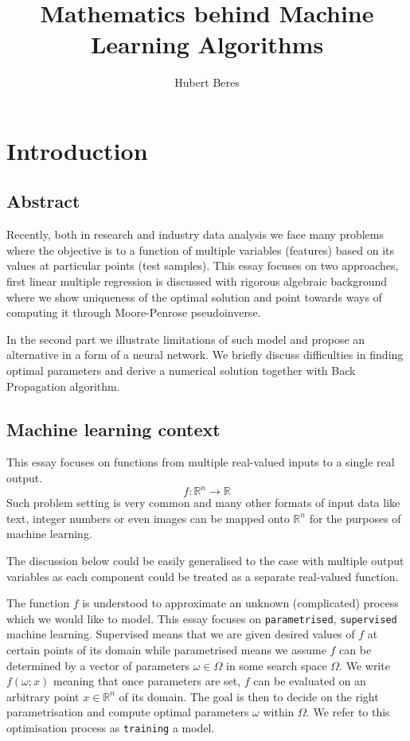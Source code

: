 \documentclass[a4paper]{article}
\title{Mathematics behind Machine Learning Algorithms}
\author{Hubert Beres}
\theoremstyle{break}
\newcommand{\R}{\mathbb{R}}
\begin{document}
\maketitle

\section{Introduction}

\subsection{Abstract}

Recently, both in research and industry data analysis we face many problems where the objective is to  a function of multiple variables (features) based on its values at particular points (test samples). This essay focuses on two approaches, first linear multiple regression is discussed with rigorous algebraic background where we show uniqueness of the optimal solution and point towards ways of computing it through Moore-Penrose pseudoinverse.

In the second part we illustrate limitations of such model and propose an alternative in a form of a neural network. We briefly discuss difficulties in finding optimal parameters and derive a numerical solution together with Back Propagation algorithm.

\subsection{Machine learning context}

This essay focuses on functions from multiple real-valued inputs to a single real output.
$$ f : \R^n \to \R $$
Such problem setting is very common and many other formats of input data like text, integer numbers or even images can be mapped onto $\R^n$ for the purposes of machine learning.

The discussion below could be easily generalised to the case with multiple output variables as each component could be treated as a separate real-valued function.

The function $f$ is understood to approximate an unknown (complicated) process which we would like to model. This essay focuses on {\tt parametrised}, {\tt supervised} machine learning. Supervised means that we are given desired values of $f$ at certain points of its domain while parametrised means we assume $f$ can be determined by a vector of parameters $ \omega \in \Omega$ in some search space $\Omega$. We write $ f(\omega; x) $ meaning that once parameters are set, $f$ can be evaluated on an arbitrary point $x \in \R^n$ of its domain. The goal is then to decide on the right parametrisation and compute optimal parameters $\omega$ within $\Omega$. We refer to this optimisation process as {\tt training} a model.
\end{document}
